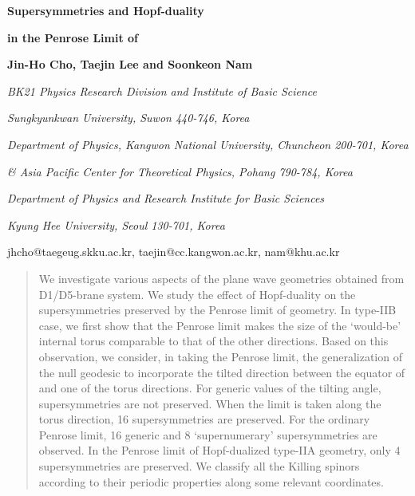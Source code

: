 \documentclass[a4paper,12pt]{article}
\begin{document}
\begin{titlepage}
\bigskip
\rightline{}
\bigskip\bigskip\bigskip\bigskip
   \centerline{\Large \bf {Supersymmetries and Hopf-duality}}
   \bigskip
\centerline{\Large \bf {in the Penrose Limit of \coordHE{}}}
    \bigskip\bigskip
     \bigskip\bigskip

\centerline{\bf Jin-Ho Cho\myHighlight{${}^*$}\coordHE{}, Taejin Lee\myHighlight{${}^\dagger$}\coordHE{} and Soonkeon Nam\myHighlight{${}^\ddagger$}\coordHE{}}
\bigskip\bigskip
   \centerline{\em \myHighlight{${}^*$}\coordHE{}BK21 Physics Research Division and Institute of Basic Science}
\centerline{\em Sungkyunkwan University, 
Suwon 440-746, Korea}
\bigskip
   \centerline{\em \myHighlight{${}^\dagger$}\coordHE{}Department of Physics, Kangwon National University, 
 Chuncheon 200-701, Korea}
\centerline{\em \& Asia Pacific Center for Theoretical Physics, Pohang 790-784, Korea}
\bigskip
   \centerline{\em \myHighlight{${}^\ddagger$}\coordHE{}Department of Physics and Research Institute for Basic Sciences}
\centerline{\em Kyung Hee University, 
 Seoul 130-701, Korea}
\bigskip
\centerline{\sf jhcho@taegeug.skku.ac.kr, taejin@cc.kangwon.ac.kr, nam@khu.ac.kr}
    \bigskip\bigskip


\begin{abstract}
We investigate various aspects of the plane wave geometries obtained from D1/D5-brane system.
We study the effect of Hopf-duality on the supersymmetries preserved by the Penrose limit of \coordHE{} geometry. In type-IIB case, we first show that the Penrose limit makes the size of the `would-be' internal torus comparable to that of the other directions. Based on this observation, we consider, in taking the Penrose limit, the generalization of the null geodesic to incorporate the tilted direction between the equator of \coordHE{} and one of the torus directions. For generic values of the tilting angle, supersymmetries are not preserved. When the limit is taken along the torus direction, 16 supersymmetries are preserved. For the ordinary Penrose limit, 16 generic and 8 `supernumerary' supersymmetries are observed. In the Penrose limit of Hopf-dualized type-IIA geometry, only 4 supersymmetries are preserved. We classify all the Killing spinors according to their periodic properties along some relevant coordinates.
\end{abstract}
    \end{titlepage}
\end{document}
